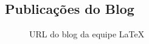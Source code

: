 
\begin{apendicesenv}

\partapendices

%
%
%

\chapter{Publicações do Blog}

\begin{figure}[htb]
	\caption{\label{qr-url-blog}URL do blog da equipe \LaTeX}
	\begin{center}
	\end{center}
\end{figure}

\end{apendicesenv}
